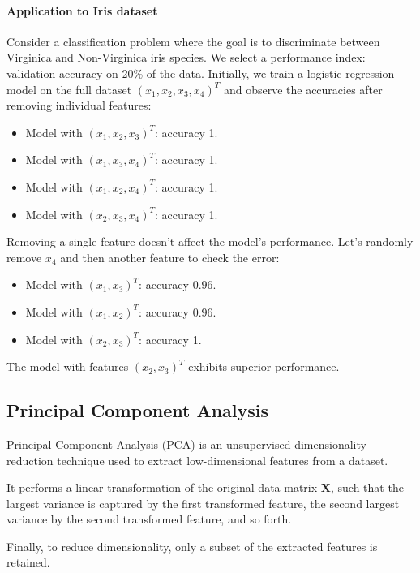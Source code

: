 \paragraph*{Application to Iris dataset}
Consider a classification problem where the goal is to discriminate between Virginica and Non-Virginica iris species.
We select a performance index: validation accuracy on 20\% of the data.
Initially, we train a logistic regression model on the full dataset $(x_1, x_2, x_3, x_4)^T$ and observe the accuracies after removing individual features:
\begin{itemize}
    \item Model with $(x_1, x_2, x_3)^T$: accuracy 1.
    \item Model with $(x_1, x_3, x_4)^T$: accuracy 1.
    \item Model with $(x_1, x_2, x_4)^T$: accuracy 1.
    \item Model with $(x_2, x_3, x_4)^T$: accuracy 1.
\end{itemize}
Removing a single feature doesn't affect the model's performance.
Let's randomly remove $x_4$ and then another feature to check the error:
\begin{itemize}
    \item Model with $(x_1, x_3)^T$: accuracy 0.96.
    \item Model with $(x_1, x_2)^T$: accuracy 0.96.
    \item Model with $(x_2, x_3)^T$: accuracy 1.
\end{itemize}
The model with features $(x_2, x_3)^T$ exhibits superior performance.

\subsection{Principal Component Analysis}
Principal Component Analysis (PCA) is an unsupervised dimensionality reduction technique used to extract low-dimensional features from a dataset.

It performs a linear transformation of the original data matrix $\mathbf{X}$, such that the largest variance is captured by the first transformed feature, the second largest variance by the second transformed feature, and so forth.

Finally, to reduce dimensionality, only a subset of the extracted features is retained.

